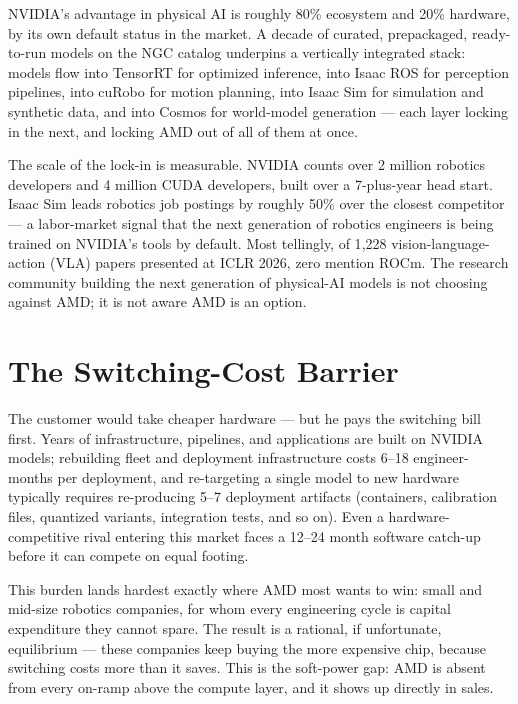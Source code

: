 \documentclass[blind]{gtac}
\begin{document}
NVIDIA's advantage in physical AI is roughly 80\% ecosystem and 20\% hardware, by its own default status in the market. A decade of curated, prepackaged, ready-to-run models on the NGC catalog underpins a vertically integrated stack: models flow into TensorRT for optimized inference, into Isaac ROS for perception pipelines, into cuRobo for motion planning, into Isaac Sim for simulation and synthetic data, and into Cosmos for world-model generation --- each layer locking in the next, and locking AMD out of all of them at once.

The scale of the lock-in is measurable. NVIDIA counts over 2 million robotics developers and 4 million CUDA developers, built over a 7-plus-year head start. Isaac Sim leads robotics job postings by roughly 50\% over the closest competitor --- a labor-market signal that the next generation of robotics engineers is being trained on NVIDIA's tools by default. Most tellingly, of 1{,}228 vision-language-action (VLA) papers presented at ICLR 2026, zero mention ROCm. The research community building the next generation of physical-AI models is not choosing against AMD; it is not aware AMD is an option.

\section{The Switching-Cost Barrier}
\label{sec:switching}

The customer would take cheaper hardware --- but he pays the switching bill first. Years of infrastructure, pipelines, and applications are built on NVIDIA models; rebuilding fleet and deployment infrastructure costs 6--18 engineer-months per deployment, and re-targeting a single model to new hardware typically requires re-producing 5--7 deployment artifacts (containers, calibration files, quantized variants, integration tests, and so on). Even a hardware-competitive rival entering this market faces a 12--24 month software catch-up before it can compete on equal footing.

This burden lands hardest exactly where AMD most wants to win: small and mid-size robotics companies, for whom every engineering cycle is capital expenditure they cannot spare. The result is a rational, if unfortunate, equilibrium --- these companies keep buying the more expensive chip, because switching costs more than it saves. This is the soft-power gap: AMD is absent from every on-ramp above the compute layer, and it shows up directly in sales.
\end{document}
